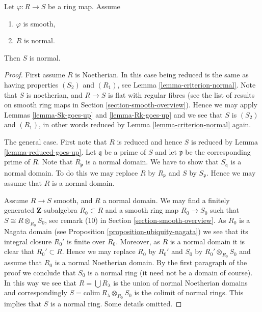\begin{lemma}
\label{lemma-normal-goes-up}
Let $\varphi : R \to S$ be a ring map. Assume
\begin{enumerate}
\item $\varphi$ is smooth,
\item $R$ is normal.
\end{enumerate}
Then $S$ is normal.
\end{lemma}

\begin{proof}
First assume $R$ is Noetherian.
In this case being reduced is the same as having properties
$(S_2)$ and $(R_1)$, see Lemma \ref{lemma-criterion-normal}.
Note that $S$ is noetherian, and
$R \to S$ is flat with regular fibres (see the list of
results on smooth ring maps in Section \ref{section-smooth-overview}).
Hence we may apply Lemmas \ref{lemma-Sk-goes-up} and \ref{lemma-Rk-goes-up}
and we see that $S$ is $(S_2)$ and $(R_1)$, in other words reduced
by Lemma \ref{lemma-criterion-normal} again.

\medskip\noindent
The general case. First note that $R$ is reduced and hence
$S$ is reduced by Lemma \ref{lemma-reduced-goes-up}.
Let $\mathfrak q$ be a prime of $S$ and let $\mathfrak p$ be
the corresponding prime of $R$. Note that $R_{\mathfrak p}$
is a normal domain. We have to show that $S_{\mathfrak q}$ is
a normal domain. To do this we may replace $R$ by $R_{\mathfrak p}$
and $S$ by $S_{\mathfrak p}$. Hence we may assume that $R$ is
a normal domain.

\medskip\noindent
Assume $R \to S$ smooth, and $R$ a normal domain.
We may find a finitely generated $\mathbf{Z}$-subalgebra
$R_0 \subset R$ and a smooth ring map $R_0 \to S_0$ such
that $S \cong R \otimes_{R_0} S_0$, see
remark (10) in Section \ref{section-smooth-overview}.
As $R_0$ is a Nagata domain (see Proposition \ref{proposition-ubiquity-nagata})
we see that its integral closure $R_0'$ is finite over $R_0$. 
Moreover, as $R$ is a normal domain it is clear that $R_0' \subset R$.
Hence we may replace $R_0$ by $R_0'$ and $S_0$ by
$R_0' \otimes_{R_0} S_0$ and assume that $R_0$ is a normal
Noetherian domain. By the first paragraph of the proof we conclude
that $S_0$ is a normal ring (it need not be a domain of course).
In this way we see that $R = \bigcup R_\lambda$
is the union of normal Noetherian domains and correspondingly
$S = \text{colim}\ R_\lambda \otimes_{R_0} S_0$ is the colimit
of normal rings. This implies that $S$ is a normal ring.
Some details omitted.
\end{proof}


